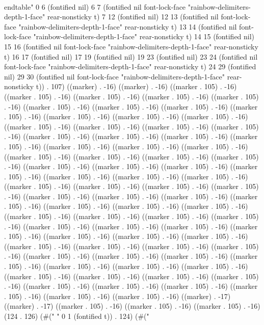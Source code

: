   \\end{table}" 0 6 (fontified nil) 6 7 (fontified nil font-lock-face "rainbow-delimiters-depth-1-face" rear-nonsticky t) 7 12 (fontified nil) 12 13 (fontified nil font-lock-face "rainbow-delimiters-depth-1-face" rear-nonsticky t) 13 14 (fontified nil font-lock-face "rainbow-delimiters-depth-1-face" rear-nonsticky t) 14 15 (fontified nil) 15 16 (fontified nil font-lock-face "rainbow-delimiters-depth-1-face" rear-nonsticky t) 16 17 (fontified nil) 17 19 (fontified nil) 19 23 (fontified nil) 23 24 (fontified nil font-lock-face "rainbow-delimiters-depth-1-face" rear-nonsticky t) 24 29 (fontified nil) 29 30 (fontified nil font-lock-face "rainbow-delimiters-depth-1-face" rear-nonsticky t)) . 107) ((marker) . -16) ((marker) . -16) ((marker . 105) . -16) ((marker . 105) . -16) ((marker . 105) . -16) ((marker . 105) . -16) ((marker . 105) . -16) ((marker . 105) . -16) ((marker . 105) . -16) ((marker . 105) . -16) ((marker . 105) . -16) ((marker . 105) . -16) ((marker . 105) . -16) ((marker . 105) . -16) ((marker . 105) . -16) ((marker . 105) . -16) ((marker . 105) . -16) ((marker . 105) . -16) ((marker . 105) . -16) ((marker . 105) . -16) ((marker . 105) . -16) ((marker . 105) . -16) ((marker . 105) . -16) ((marker . 105) . -16) ((marker . 105) . -16) ((marker . 105) . -16) ((marker . 105) . -16) ((marker . 105) . -16) ((marker . 105) . -16) ((marker . 105) . -16) ((marker . 105) . -16) ((marker . 105) . -16) ((marker . 105) . -16) ((marker . 105) . -16) ((marker . 105) . -16) ((marker . 105) . -16) ((marker . 105) . -16) ((marker . 105) . -16) ((marker . 105) . -16) ((marker . 105) . -16) ((marker . 105) . -16) ((marker . 105) . -16) ((marker . 105) . -16) ((marker . 105) . -16) ((marker . 105) . -16) ((marker . 105) . -16) ((marker . 105) . -16) ((marker . 105) . -16) ((marker . 105) . -16) ((marker . 105) . -16) ((marker . 105) . -16) ((marker . 105) . -16) ((marker . 105) . -16) ((marker . 105) . -16) ((marker . 105) . -16) ((marker . 105) . -16) ((marker . 105) . -16) ((marker . 105) . -16) ((marker . 105) . -16) ((marker . 105) . -16) ((marker . 105) . -16) ((marker . 105) . -16) ((marker . 105) . -16) ((marker . 105) . -16) ((marker . 105) . -16) ((marker . 105) . -16) ((marker . 105) . -16) ((marker . 105) . -16) ((marker . 105) . -16) ((marker . 105) . -16) ((marker . 105) . -16) ((marker . 105) . -16) ((marker . 105) . -16) ((marker . 105) . -16) ((marker . 105) . -16) ((marker . 105) . -16) ((marker . 105) . -16) ((marker . 105) . -16) ((marker . 105) . -16) ((marker) . -17) ((marker) . -17) ((marker . 105) . -16) ((marker . 105) . -16) ((marker . 105) . -16) (124 . 126) (#(" " 0 1 (fontified t)) . 124) (#("
